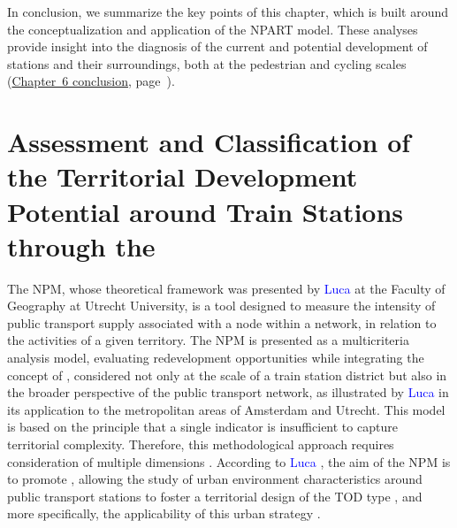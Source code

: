 \begin{refsegment}
In conclusion, we summarize the key points of this chapter, which is built around the conceptualization and application of the \acrshort{NPART} model. These analyses provide insight into the diagnosis of the current and potential development of stations and their surroundings, both at the pedestrian and cycling scales (\hyperref[chap6:conclusion]{Chapter~6 conclusion}, page~\pageref{chap6:conclusion}).%

    \newpage
\section{Assessment and Classification of the Territorial Development Potential around Train Stations through the 
    \label{chap6:revue-litterature-m-tod-index}
    }

The \acrfull{NPM}, whose theoretical framework was presented by \textcolor{blue}{Luca} \textcolor{blue}{\textcite[343]{bertolini_nodes_1996}} at the Faculty of Geography at Utrecht University, is a tool designed to measure the intensity of public transport supply associated with a node within a network, in relation to the activities of a given territory. The \acrshort{NPM} is presented as a multicriteria analysis model, evaluating redevelopment opportunities while integrating the concept of , considered not only at the scale of a train station district but also in the broader perspective of the public transport network, as illustrated by \textcolor{blue}{Luca} \textcolor{blue}{\textcite[206]{bertolini_spatial_1999}} in its application to the metropolitan areas of Amsterdam and Utrecht. This model is based on the principle that a single indicator is insufficient to capture territorial complexity. Therefore, this methodological approach requires consideration of multiple dimensions \textcolor{blue}{\autocite[5]{arliani_measuring_2023}}. According to \textcolor{blue}{Luca} \textcolor{blue}{\textcite[200]{bertolini_spatial_1999}}, the aim of the \acrshort{NPM} is to promote , allowing the study of urban environment characteristics around public transport stations to foster a territorial design of the \acrfull{TOD} type \textcolor{blue}{\autocite[55]{kamruzzaman_advance_2014}}, and more specifically, the applicability of this urban strategy \textcolor{blue}{\autocites[516-517]{filion_smart_2007}[97]{curtis_delivering_2012}}.%


\end{refsegment}
